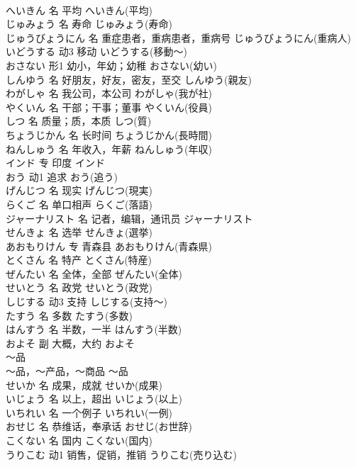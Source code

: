 \documentclass[8pt]{extreport}
\begin{document}
\begin{CJK}{UTF8}{min}
\\	へいきん	名	平均	へいきん(平均)	
\\	じゅみょう	名	寿命	じゅみょう(寿命)	
\\	じゅうびょうにん	名	重症患者，重病患者，重病号	じゅうびょうにん(重病人)	
\\	いどうする	动3	移动	いどうする(移動～)	
\\	おさない	形1	幼小，年幼；幼稚	おさない(幼い)	
\\	しんゆう	名	好朋友，好友，密友，至交	しんゆう(親友)	
\\	わがしゃ	名	我公司，本公司	わがしゃ(我が社)	
\\	やくいん	名	干部；干事；董事	やくいん(役員)	
\\	しつ	名	质量；质，本质	しつ(質)	
\\	ちょうじかん	名	长时间	ちょうじかん(長時間)	
\\	ねんしゅう	名	年收入，年薪	ねんしゅう(年収)	
\\	インド	专	印度	インド	
\\	おう	动1	追求	おう(追う)	
\\	げんじつ	名	现实	げんじつ(現実)	
\\	らくご	名	单口相声	らくご(落語)	
\\	ジャーナリスト	名	记者，编辑，通讯员	ジャーナリスト	
\\	せんきょ	名	选举	せんきょ(選挙)	
\\	あおもりけん	专	青森县	あおもりけん(青森県)	
\\	とくさん	名	特产	とくさん(特産)	
\\	ぜんたい	名	全体，全部	ぜんたい(全体)	
\\	せいとう	名	政党	せいとう(政党)	
\\	しじする	动3	支持	しじする(支持～)	
\\	たすう	名	多数	たすう(多数)	
\\	はんすう	名	半数，一半	はんすう(半数)	
\\	およそ	副	大概，大约	およそ	
\\	～品	
\\	～品，～产品，～商品	～品	
\\	せいか	名	成果，成就	せいか(成果)	
\\	いじょう	名	以上，超出	いじょう(以上)	
\\	いちれい	名	一个例子	いちれい(一例)	
\\	おせじ	名	恭维话，奉承话	おせじ(お世辞)	
\\	こくない	名	国内	こくない(国内)	
\\	うりこむ	动1	销售，促销，推销	うりこむ(売り込む)	

\end{CJK}
\end{document}
